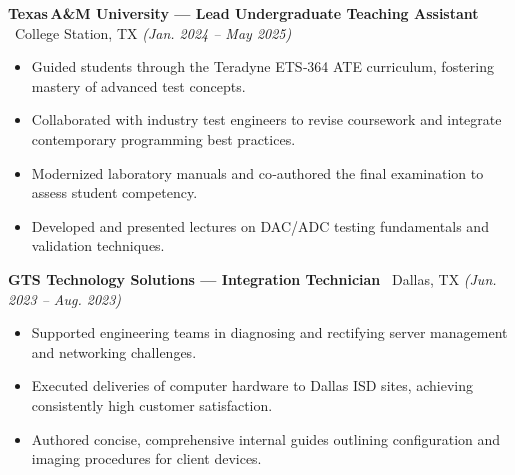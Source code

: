 \documentclass[class=article, crop=false]{standalone}
\begin{document}
\textbf{Texas A\&M University --- Lead Undergraduate Teaching Assistant} \textbar\ College Station, TX
\hfill \textsl{(Jan. 2024 -- May 2025)}

\begin{itemize}[leftmargin=*]
    \item Guided students through the Teradyne ETS‑364 ATE curriculum, fostering 
    mastery of advanced test concepts.
    
    \item Collaborated with industry test engineers to revise coursework and 
    integrate contemporary programming best practices.

    \item Modernized laboratory manuals and co‑authored the final examination to 
    assess student competency.

    \item Developed and presented lectures on DAC/ADC testing fundamentals and 
    validation techniques.
\end{itemize}
\split

\textbf{GTS Technology Solutions --- Integration Technician} \textbar\ Dallas, TX
\hfill \textsl{(Jun. 2023 -- Aug. 2023)}

\begin{itemize}[leftmargin=*]
    \item Supported engineering teams in diagnosing and rectifying server 
    management and networking challenges.

    \item Executed deliveries of computer hardware to Dallas ISD sites, 
    achieving consistently high customer satisfaction.

    \item Authored concise, comprehensive internal guides outlining 
    configuration and imaging procedures for client devices.
\end{itemize}
\end{document}
